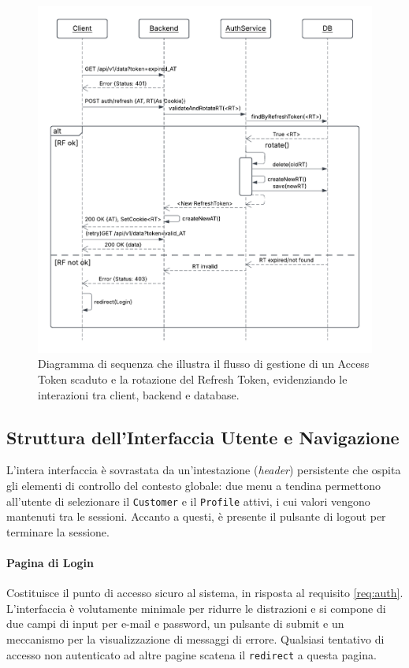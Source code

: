 \documentclass[12pt,a4paper,openright,twoside]{book}
\begin{document}
\begin{figure}[htbp]
    \centering
    \includegraphics[width=\textwidth]{figures/expired_ac.pdf}
    \caption{Diagramma di sequenza che illustra il flusso di gestione di un Access Token scaduto e la rotazione del Refresh Token, evidenziando le interazioni tra client, backend e database.}
    \label{fig:token_rotation_sequence_uml}
\end{figure}

\FloatBarrier

\subsection{Struttura dell'Interfaccia Utente e Navigazione}
L'intera interfaccia è sovrastata da un'intestazione (\textit{header}) persistente che ospita gli elementi di controllo del contesto globale: due menu a tendina permettono all'utente di selezionare il \texttt{Customer} e il \texttt{Profile} attivi, i cui valori vengono mantenuti tra le sessioni. Accanto a questi, è presente il pulsante di logout per terminare la sessione.

\paragraph{Pagina di Login}
Costituisce il punto di accesso sicuro al sistema, in risposta al requisito \ref{req:auth}. L'interfaccia è volutamente minimale per ridurre le distrazioni e si compone di due campi di input per e-mail e password, un pulsante di submit e un meccanismo per la visualizzazione di messaggi di errore. Qualsiasi tentativo di accesso non autenticato ad altre pagine scatena il \texttt{redirect} a questa pagina.
\end{document}
